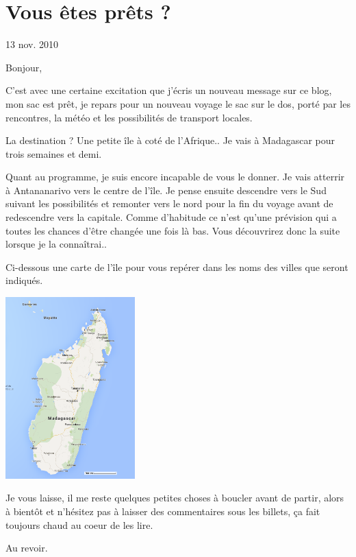 \section{Vous êtes prêts ?}

13 nov. 2010

\begin{multicols}{2}

Bonjour,

C'est avec une certaine excitation que j'écris un nouveau message sur ce blog, mon sac est prêt, je repars pour un nouveau voyage le sac sur le dos, porté par les rencontres, la météo et les possibilités de transport locales.

La destination ? Une petite île à coté de l'Afrique.. Je vais à Madagascar pour trois semaines et demi.

Quant au programme, je suis encore incapable de vous le donner. Je vais atterrir à Antananarivo vers le centre de l'île. Je pense ensuite descendre vers le Sud suivant les possibilités et remonter vers le nord pour la fin du voyage avant de redescendre vers la capitale. Comme d'habitude ce n'est qu'une prévision qui a toutes les chances d'être changée une fois là bas. Vous découvrirez donc la suite lorsque je la connaîtrai..

Ci-dessous une carte de l'île pour vous repérer dans les noms des villes que seront indiqués.

\smallbreak
\hspace*{-0.65cm}
\includegraphics[width=5cm]{articles/Vous-etes-prets/madagascar.png}
\smallbreak

Je vous laisse, il me reste quelques petites choses à boucler avant de partir, alors à bientôt et n'hésitez pas à laisser des commentaires sous les billets, ça fait toujours chaud au coeur de les lire.

Au revoir.

\end{multicols}


